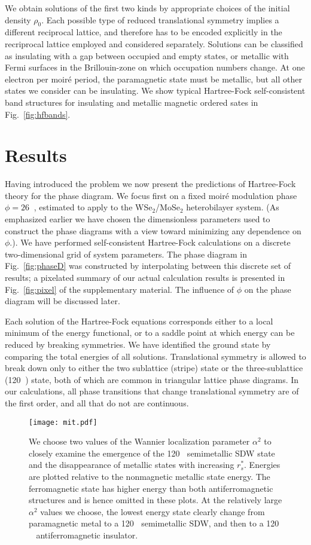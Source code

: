 \documentclass[%
 reprint,
 superscriptaddress,
 amsmath,amssymb,
 aps,
 prx,
 floatfix,
]{revtex4-2}
\newcommand{\<}{\langle}
\renewcommand{\>}{\rangle}
\renewcommand{\(}{\left(}
\renewcommand{\)}{\right)}
\renewcommand{\[}{\left[}
\renewcommand{\]}{\right]}
\DeclareMathOperator{\degree}{^{\circ}}
\begin{document}
We obtain solutions of the first two kinds by appropriate choices of the initial density $\rho_0$.
Each possible type of reduced translational symmetry implies a different reciprocal lattice,
and therefore has to be encoded explicitly in the recriprocal lattice employed and considered separately.
Solutions can be classified as insulating with a gap between occupied and empty states, or 
metallic with Fermi surfaces in the Brillouin-zone on which occupation numbers change.  
At one electron per moir\'e period, the paramagnetic state must be metallic, but all other 
states we consider can be insulating. We show typical Hartree-Fock self-consistent band structures for insulating and metallic magnetic ordered sates in Fig.~\ref{fig:hfbands}.

\section{\label{sec:results}Results}
Having introduced the problem we now present the predictions of Hartree-Fock theory for the phase diagram. 
We focus first on a fixed moir\'e modulation phase $\phi = 26\degree$, estimated \cite{fengchengHubbard}
to apply to the WSe$_2$/MoSe$_2$ heterobilayer system.  
(As emphasized earlier we have chosen the dimensionless parameters used to construct the phase 
diagrams with a view toward minimizing any dependence on $\phi$.). We have performed self-consistent 
Hartree-Fock calculations on a discrete two-dimensional grid of system parameters.
The phase diagram in Fig.~\ref{fig:phaseD} was constructed by interpolating between this discrete set of 
results; a pixelated summary of our actual calculation results is presented in Fig.~\ref{fig:pixel}
of the supplementary material.  The influence of $\phi$ on the phase diagram will be discussed later.
 
Each solution of the Hartree-Fock equations corresponds either to a local minimum of the 
energy functional, or to a saddle point at which energy can be reduced by breaking symmetries.
We have identified the ground state by comparing the total energies of all solutions.
Translational symmetry is allowed to break down only to either the two sublattice (stripe) state or 
the three-sublattice (120$\degree$) state, both of which are common in triangular lattice phase diagrams.
In our calculations, all phase transitions that change translational symmetry are
of the first order, and all that do not are continuous.

\begin{figure}
\centering
\texttt{[image: mit.pdf]}
\caption{We choose two values of the Wannier localization parameter $\alpha^2$ to 
closely examine the emergence of the 120$\degree$ semimetallic SDW state and the disappearance of metallic states with  
increasing $r_s^*$. Energies are plotted relative to the nonmagnetic metallic state energy. 
The ferromagnetic state has higher energy than both antiferromagnetic structures and is hence omitted in these plots. 
At the relatively large $\alpha^2$ values we choose, 
the lowest energy state clearly change from paramagnetic metal to a 120$\degree$ semimetallic SDW, and then to a 120$\degree$ antiferromagnetic insulator.}
\label{fig:mit}
\end{figure}
\end{document}
